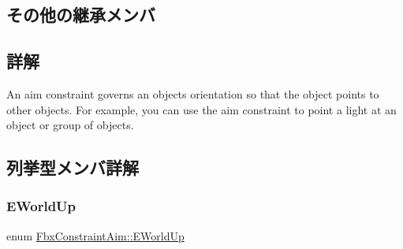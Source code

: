 \subsection*{その他の継承メンバ}


\subsection{詳解}
An aim constraint governs an object\textquotesingle{}s orientation so that the object points to other objects. For example, you can use the aim constraint to point a light at an object or group of objects. 

\subsection{列挙型メンバ詳解}
\mbox{\label{class_fbx_constraint_aim_a90316b1564490f5dd0b24e552fe6e637}} 
\subsubsection{\texorpdfstring{E\+World\+Up}{EWorldUp}}
{\footnotesize\ttfamily enum \hyperlink{class_fbx_constraint_aim_a90316b1564490f5dd0b24e552fe6e637}{Fbx\+Constraint\+Aim\+::\+E\+World\+Up}}

